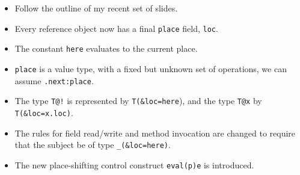 \documentclass{article}
\def\FXten{{\sf FX10}}
\begin{document}
{\em
  \begin{itemize}
    \item Follow the outline of my recent set of slides.
    \item Every reference object now has a final {\tt place} field, {\tt loc}.
    \item The constant {\tt here} evaluates to the current place.
    \item {\tt place} is a value type, with a fixed but unknown set of
      operations, we can assume {\tt .next:place}.
    \item The type {\tt T@!} is represented by {\tt T(\&loc=here}), and
      the type {\tt T@x} by {\tt T(\&loc=x.loc)}.
    \item The rules for field read/write and method invocation are changed to require that
      the subject be of type {\tt \_(\&loc=here)}.
    \item The new place-shifting control construct {\tt eval(p)e} is introduced.
  \end{itemize}
}





\end{document}
